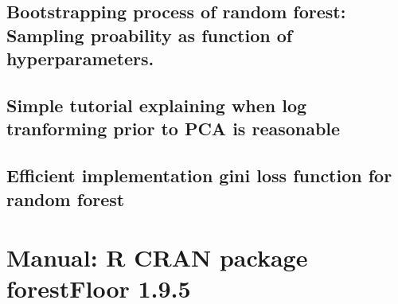 \subsection{Bootstrapping process of random forest: Sampling proability as function of hyperparameters.}

\label{CV9_RFsampling}


\subsection{Simple tutorial explaining when log tranforming prior to PCA is reasonable}

\label{CV10_PCAlogTransform}

\subsection{Efficient implementation gini loss function for random forest}

\label{CV11_RFginigain}



\section{Manual: R CRAN package forestFloor 1.9.5}



